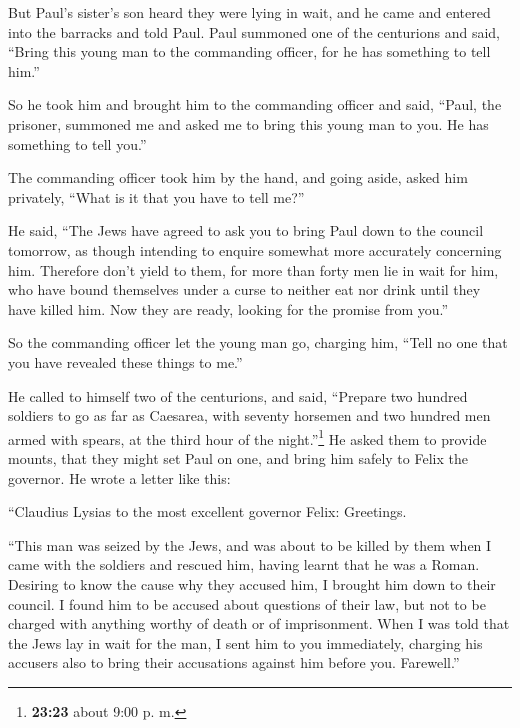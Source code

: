  But Paul's sister's son heard they were lying in wait,
and he came and entered into the barracks and told Paul. 
Paul summoned one of the centurions and said, ``Bring this young man to
the commanding officer, for he has something to tell him.''

 So he took him and brought him to the commanding officer
and said, ``Paul, the prisoner, summoned me and asked me to bring this
young man to you. He has something to tell you.''

 The commanding officer took him by the hand, and going
aside, asked him privately, ``What is it that you have to tell me?''

 He said, ``The Jews have agreed to ask you to bring Paul
down to the council tomorrow, as though intending to enquire somewhat
more accurately concerning him.  Therefore don't yield to
them, for more than forty men lie in wait for him, who have bound
themselves under a curse to neither eat nor drink until they have killed
him. Now they are ready, looking for the promise from you.''

 So the commanding officer let the young man go, charging
him, ``Tell no one that you have revealed these things to me.''

 He called to himself two of the centurions, and said,
``Prepare two hundred soldiers to go as far as Caesarea, with seventy
horsemen and two hundred men armed with spears, at the third hour of the
night.''\footnote{\textbf{23:23} about 9:00 p. m.}  He
asked them to provide mounts, that they might set Paul on one, and bring
him safely to Felix the governor.  He wrote a letter like
this:

 ``Claudius Lysias to the most excellent governor Felix:
Greetings.

 ``This man was seized by the Jews, and was about to be
killed by them when I came with the soldiers and rescued him, having
learnt that he was a Roman.  Desiring to know the cause
why they accused him, I brought him down to their council.
 I found him to be accused about questions of their law,
but not to be charged with anything worthy of death or of imprisonment.
 When I was told that the Jews lay in wait for the man, I
sent him to you immediately, charging his accusers also to bring their
accusations against him before you. Farewell.''

